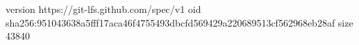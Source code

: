 version https://git-lfs.github.com/spec/v1
oid sha256:951043638a5fff17aca46f4755493dbcfd569429a220689513cf562968eb28af
size 43840

